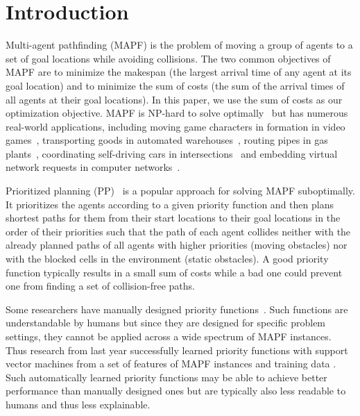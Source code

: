 \section{Introduction}
\label{sec:introduction}

Multi-agent pathfinding (MAPF) is the problem of moving a group of agents to a set of goal locations while avoiding collisions. The two common objectives of MAPF are to minimize the makespan (the largest arrival time of any agent at its goal location) and to minimize the sum of costs (the sum of the arrival times of all agents at their goal locations). In this paper, we use the sum of costs as our optimization objective. MAPF is NP-hard to solve optimally~\citep{yu213structure, surynek21optimization, ma21multi} but has numerous real-world applications, including moving game characters in formation in video games~\citep{ma217feasibility}, transporting goods in automated warehouses~\cite{wurman2coordinating}, routing pipes in gas plants~\cite{Koen2r}, coordinating self-driving cars in intersections~\cite{Koen23e} and embedding virtual network requests in computer networks~\cite{Koen23g}.

Prioritized planning (PP)~\citep{latombe1991multiple,bennewitz2finding,silver25cooperative,van25prioritized} is a popular approach for solving MAPF suboptimally. It prioritizes the agents according to a given priority function and then plans shortest paths for them from their start locations to their goal locations in the order of their priorities such that the path of each agent collides neither with the already planned paths of all agents with higher priorities (moving obstacles) nor with the blocked cells in the environment (static obstacles). A good priority function typically results in a small sum of costs while a bad one could prevent one from finding a set of collision-free paths.

Some researchers have manually designed priority functions~\citep{van2005prioritized, wang2019new, wu2020multi, buckley19fast, li2019coupling}. Such functions are understandable by humans but since they are designed for specific problem settings, they cannot be applied across a wide spectrum of MAPF instances. Thus research from last year successfully learned priority functions with support vector machines from a set of features of MAPF instances and training data \citep{zhang2learning}. Such automatically learned priority functions may be able to achieve better performance than manually designed ones but are typically also less readable to humans and thus less explainable.

